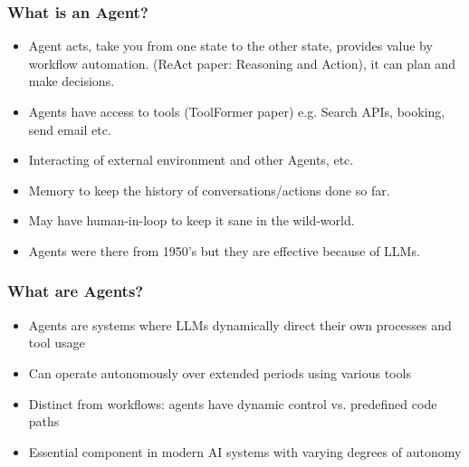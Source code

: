 \begin{frame}[fragile]\frametitle{What is an Agent?}
    \begin{itemize}
        \item Agent acts, take you from one state to the other state, provides value by workflow automation. (ReAct paper: Reasoning and Action), it can plan and make decisions.
		\item Agents have access to tools (ToolFormer paper) e.g. Search APIs, booking, send email etc.
		\item Interacting of external environment and other Agents, etc.
		\item Memory to keep the history of conversations/actions done so far.
		\item May have human-in-loop to keep it sane in the wild-world.
		\item Agents were there from 1950's but they are effective because of LLMs.
    \end{itemize}
\end{frame}

\begin{frame}[fragile]\frametitle{What are Agents?}
    \begin{itemize}
        \item Agents are systems where LLMs dynamically direct their own processes and tool usage
        \item Can operate autonomously over extended periods using various tools
        \item Distinct from workflows: agents have dynamic control vs. predefined code paths
        \item Essential component in modern AI systems with varying degrees of autonomy
    \end{itemize}
\end{frame}

